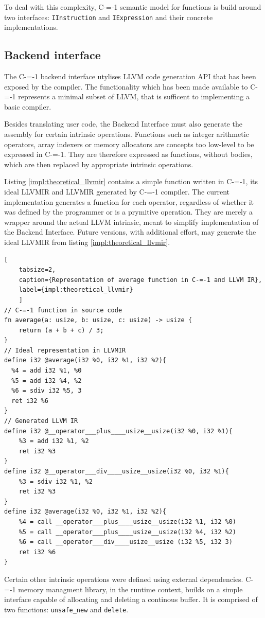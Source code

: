 To deal with this complexity, C-=-1 semantic model for functions is build around two interfaces: \lstinline{IInstruction} and \lstinline{IExpression} and their concrete implementations.

\subsection{Backend interface}
\label{implementation/backend-interface}

The C-=-1 backend interface utylises LLVM code generation API that has been exposed by the compiler.
The functionality which has been made available to C-=-1 represents a minimal subset of LLVM, that is sufficent to implementing a basic compiler.

Besides translating user code, the Backend Interface must also generate the assembly for certain intrinsic operations.
Functions such as integer arithmetic operators, array indexers or memory allocators are concepts too low-level to be expressed in C-=-1.
They are therefore expressed as functions, without bodies, which are then replaced by appropriate intrinsic operations.

Listing \ref{impl:theoretical_llvmir} contains a simple function written in C-=-1, its ideal LLVMIR and LLVMIR generated by C-=-1 compiler.
The current implementation generates a function for each operator, regardless of whether it was defined by the programmer or is a prymitive operation.
They are merely a wrapper around the actual LLVM intrinsic, meant to simplify implementation of the Backend Interface.
Future versions, with additional effort, may generate the ideal LLVMIR from listing \ref{impl:theoretical_llvmir}.

\begin{minipage}{\linewidth}
\begin{lstlisting}[
	tabsize=2,
	caption={Representation of average function in C-=-1 and LLVM IR},
	label={impl:theoretical_llvmir}
	]
// C-=-1 function in source code
fn average(a: usize, b: usize, c: usize) -> usize {
	return (a + b + c) / 3;
}
// Ideal representation in LLVMIR
define i32 @average(i32 %0, i32 %1, i32 %2){
  %4 = add i32 %1, %0
  %5 = add i32 %4, %2
  %6 = sdiv i32 %5, 3
  ret i32 %6
}
// Generated LLVM IR
define i32 @__operator___plus____usize__usize(i32 %0, i32 %1){
	%3 = add i32 %1, %2
	ret i32 %3
}
define i32 @__operator___div____usize__usize(i32 %0, i32 %1){
	%3 = sdiv i32 %1, %2
	ret i32 %3
}
define i32 @average(i32 %0, i32 %1, i32 %2){
	%4 = call __operator___plus____usize__usize(i32 %1, i32 %0)
	%5 = call __operator___plus____usize__usize(i32 %4, i32 %2)
	%6 = call __operator___div____usize__usize (i32 %5, i32 3)
	ret i32 %6
}
\end{lstlisting}
\end{minipage}

Certain other intrinsic operations were defined using external dependencies.
C-=-1 memory managment library, in the runtime context, builds on a simple interface capable of allocating and deleting a continous buffer.
It is comprised of two functions: \lstinline{unsafe_new} and \lstinline{delete}.

